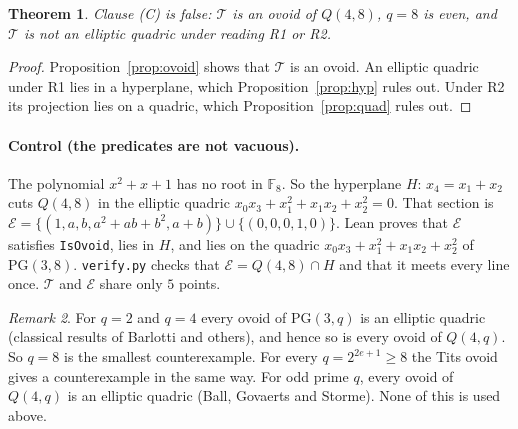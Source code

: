 \documentclass[11pt]{article}
\newtheorem{theorem}{Theorem}
\theoremstyle{definition}
\theoremstyle{remark}
\newtheorem{remark}[theorem]{Remark}
\newcommand{\F}{\mathbb{F}_8}
\begin{document}
\begin{theorem}
Clause (C) is false: $\mathcal{T}$ is an ovoid of $Q(4,8)$, $q=8$ is even, and
$\mathcal{T}$ is not an elliptic quadric under reading R1 or R2.
\end{theorem}
\begin{proof}
Proposition~\ref{prop:ovoid} shows that $\mathcal{T}$ is an ovoid. An elliptic
quadric under R1 lies in a hyperplane, which Proposition~\ref{prop:hyp} rules
out. Under R2 its projection lies on a quadric, which
Proposition~\ref{prop:quad} rules out.
\end{proof}

\paragraph{Control (the predicates are not vacuous).}
The polynomial $x^2+x+1$ has no root in $\F$. So the hyperplane
$H:\,x_4=x_1+x_2$ cuts $Q(4,8)$ in the elliptic quadric
$x_0x_3+x_1^2+x_1x_2+x_2^2=0$. That section is
$\mathcal{E}=\{(1,a,b,a^2+ab+b^2,a+b)\}\cup\{(0,0,0,1,0)\}$. Lean proves that
$\mathcal{E}$ satisfies \texttt{IsOvoid}, lies in $H$, and lies on the quadric
$x_0x_3+x_1^2+x_1x_2+x_2^2$ of $\mathrm{PG}(3,8)$. \texttt{verify.py} checks
that $\mathcal{E}=Q(4,8)\cap H$ and that it meets every line once.
$\mathcal{T}$ and $\mathcal{E}$ share only $5$ points.

\begin{remark}
For $q=2$ and $q=4$ every ovoid of $\mathrm{PG}(3,q)$ is an elliptic quadric
(classical results of Barlotti and others), and hence so is every ovoid of $Q(4,q)$. So $q=8$ is the smallest
counterexample. For every $q=2^{2e+1}\ge8$ the Tits ovoid gives a counterexample
in the same way. For odd prime $q$, every ovoid of $Q(4,q)$ is an elliptic quadric
(Ball, Govaerts and Storme). None of this is used above.
\end{remark}
\end{document}
